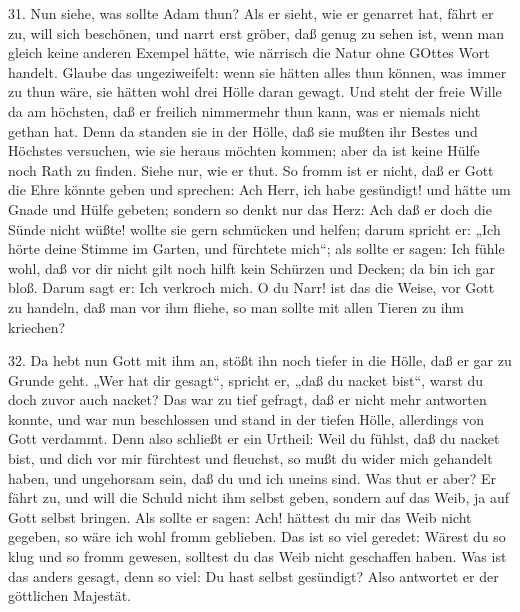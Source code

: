31. Nun siehe, was sollte Adam thun? Als er sieht, wie er genarret hat, fährt er zu, will sich beschönen, und narrt erst gröber, daß genug zu sehen ist, wenn man gleich keine anderen Exempel hätte, wie närrisch die Natur ohne GOttes Wort handelt. Glaube das ungeziweifelt: wenn sie hätten alles thun können, was immer zu thun wäre, sie hätten wohl drei Hölle daran gewagt. Und steht der freie Wille da
am höchsten, daß er freilich nimmermehr thun kann, was er niemals nicht gethan hat. Denn da standen sie in der Hölle, daß sie mußten ihr Bestes und Höchstes versuchen, wie sie heraus möchten kommen; aber da ist keine Hülfe noch Rath zu finden. Siehe nur, wie er thut. So fromm ist er nicht, daß er Gott die Ehre könnte geben und sprechen: Ach Herr, ich habe gesündigt! und hätte um Gnade und Hülfe gebeten; sondern so denkt nur das Herz: Ach daß er doch die Sünde nicht wüßte! wollte sie gern schmücken und helfen; darum spricht er: „Ich hörte deine Stimme im Garten, und fürchtete mich“; als sollte er sagen: Ich fühle wohl, daß vor dir nicht gilt noch hilft kein Schürzen und Decken; da bin ich gar bloß. Darum sagt er: Ich verkroch mich. O du Narr! ist das die Weise, vor Gott zu handeln, daß man vor ihm fliehe, so man sollte mit allen Tieren zu ihm kriechen?

32. Da hebt nun Gott mit ihm an, stößt ihn noch tiefer in die Hölle, daß er gar zu Grunde geht. „Wer hat dir gesagt“, spricht er, „daß du nacket bist“, warst du doch zuvor auch nacket? Das war zu tief gefragt, daß er nicht mehr antworten konnte, und war nun beschlossen und stand in der tiefen Hölle, allerdings von Gott verdammt. Denn also schließt er ein Urtheil: Weil du fühlst, daß du nacket bist, und dich vor mir fürchtest und fleuchst, so mußt du wider mich gehandelt haben, und ungehorsam sein, daß du und ich uneins sind. Was thut er aber? Er fährt zu, und will die Schuld nicht ihm selbst geben, sondern auf das Weib, ja auf Gott selbst bringen. Als sollte er sagen: Ach! hättest du mir das Weib nicht gegeben, so wäre ich wohl fromm geblieben. Das ist so viel geredet: Wärest du so klug und so fromm gewesen, solltest du das Weib nicht geschaffen haben. Was ist das anders gesagt, denn so viel: Du hast selbst gesündigt? Also antwortet er der göttlichen Majestät.

